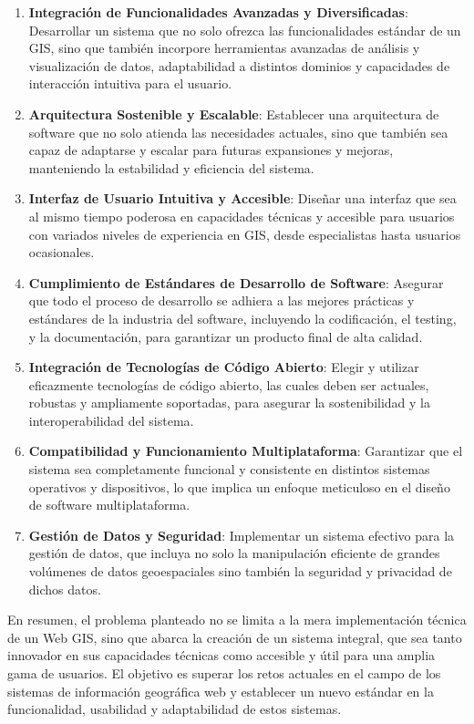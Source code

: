 \begin{enumerate}
\def\labelenumi{\arabic{enumi}.}
\item
  \textbf{Integración de Funcionalidades Avanzadas y Diversificadas}:
  Desarrollar un sistema que no solo ofrezca las funcionalidades
  estándar de un GIS, sino que también incorpore herramientas avanzadas
  de análisis y visualización de datos, adaptabilidad a distintos
  dominios y capacidades de interacción intuitiva para el usuario.
\item
  \textbf{Arquitectura Sostenible y Escalable}: Establecer una
  arquitectura de software que no solo atienda las necesidades actuales,
  sino que también sea capaz de adaptarse y escalar para futuras
  expansiones y mejoras, manteniendo la estabilidad y eficiencia del
  sistema.
\item
  \textbf{Interfaz de Usuario Intuitiva y Accesible}: Diseñar una
  interfaz que sea al mismo tiempo poderosa en capacidades técnicas y
  accesible para usuarios con variados niveles de experiencia en GIS,
  desde especialistas hasta usuarios ocasionales.
\item
  \textbf{Cumplimiento de Estándares de Desarrollo de Software}:
  Asegurar que todo el proceso de desarrollo se adhiera a las mejores
  prácticas y estándares de la industria del software, incluyendo la
  codificación, el testing, y la documentación, para garantizar un
  producto final de alta calidad.
\item
  \textbf{Integración de Tecnologías de Código Abierto}: Elegir y
  utilizar eficazmente tecnologías de código abierto, las cuales deben
  ser actuales, robustas y ampliamente soportadas, para asegurar la
  sostenibilidad y la interoperabilidad del sistema.
\item
  \textbf{Compatibilidad y Funcionamiento Multiplataforma}: Garantizar
  que el sistema sea completamente funcional y consistente en distintos
  sistemas operativos y dispositivos, lo que implica un enfoque
  meticuloso en el diseño de software multiplataforma.
\item
  \textbf{Gestión de Datos y Seguridad}: Implementar un sistema efectivo
  para la gestión de datos, que incluya no solo la manipulación
  eficiente de grandes volúmenes de datos geoespaciales sino también la
  seguridad y privacidad de dichos datos.
\end{enumerate}

En resumen, el problema planteado no se limita a la mera implementación
técnica de un Web GIS, sino que abarca la creación de un sistema
integral, que sea tanto innovador en sus capacidades técnicas como
accesible y útil para una amplia gama de usuarios. El objetivo es
superar los retos actuales en el campo de los sistemas de información
geográfica web y establecer un nuevo estándar en la funcionalidad,
usabilidad y adaptabilidad de estos sistemas.


